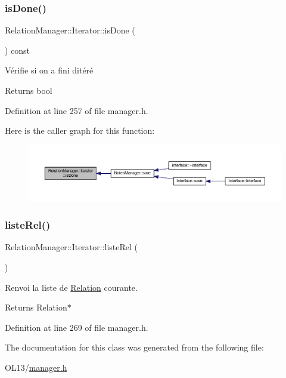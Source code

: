\subsubsection{\texorpdfstring{is\+Done()}{isDone()}}
{\footnotesize\ttfamily Relation\+Manager\+::\+Iterator\+::is\+Done (\begin{DoxyParamCaption}{ }\end{DoxyParamCaption}) const\hspace{0.3cm}{\ttfamily [inline]}}



Vérifie si on a fini d\textquotesingle{}itéré 

\begin{DoxyReturn}{Returns}
bool 
\end{DoxyReturn}


Definition at line 257 of file manager.\+h.

Here is the caller graph for this function\+:\nopagebreak
\begin{figure}[H]
\begin{center}
\leavevmode
\includegraphics[width=350pt]{class_relation_manager_1_1_iterator_a085af111a011f8f1592202cb53132f4c_icgraph}
\end{center}
\end{figure}
\mbox{\label{class_relation_manager_1_1_iterator_a63a7e7acea4f01f43b2331bc1cdd0a57}} 
\subsubsection{\texorpdfstring{liste\+Rel()}{listeRel()}}
{\footnotesize\ttfamily Relation\+Manager\+::\+Iterator\+::liste\+Rel (\begin{DoxyParamCaption}{ }\end{DoxyParamCaption})\hspace{0.3cm}{\ttfamily [inline]}}



Renvoi la liste de \hyperlink{class_relation}{Relation} courante. 

\begin{DoxyReturn}{Returns}
Relation$\ast$ 
\end{DoxyReturn}


Definition at line 269 of file manager.\+h.



The documentation for this class was generated from the following file\+:\begin{DoxyCompactItemize}
\item 
O\+L13/\hyperlink{manager_8h}{manager.\+h}\end{DoxyCompactItemize}
